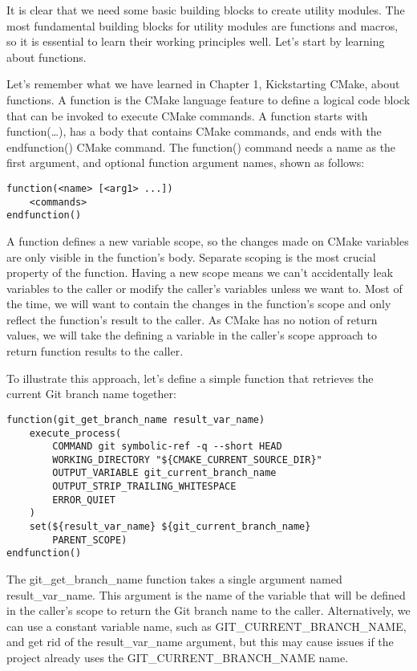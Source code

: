 
It is clear that we need some basic building blocks to create utility modules. The most fundamental building blocks for utility modules are functions and macros, so it is essential to learn their working principles well. Let's start by learning about functions.


Let's remember what we have learned in Chapter 1, Kickstarting CMake, about functions. A function is the CMake language feature to define a logical code block that can be invoked to execute CMake commands. A function starts with function(…), has a body that contains CMake commands, and ends with the endfunction() CMake command. The function() command needs a name as the first argument, and optional function argument names, shown as follows:

\begin{lstlisting}[style=styleCMake]
function(<name> [<arg1> ...])
	<commands>
endfunction()
\end{lstlisting}

A function defines a new variable scope, so the changes made on CMake variables are only visible in the function's body. Separate scoping is the most crucial property of the function. Having a new scope means we can't accidentally leak variables to the caller or modify the caller's variables unless we want to. Most of the time, we will want to contain the changes in the function's scope and only reflect the function's result to the caller. As CMake has no notion of return values, we will take the defining a variable in the caller's scope approach to return function results to the caller.

To illustrate this approach, let's define a simple function that retrieves the current Git branch name together:

\begin{lstlisting}[style=styleCMake]
function(git_get_branch_name result_var_name)
	execute_process(
		COMMAND git symbolic-ref -q --short HEAD
		WORKING_DIRECTORY "${CMAKE_CURRENT_SOURCE_DIR}"
		OUTPUT_VARIABLE git_current_branch_name
		OUTPUT_STRIP_TRAILING_WHITESPACE
		ERROR_QUIET
	)
	set(${result_var_name} ${git_current_branch_name}
		PARENT_SCOPE)
endfunction()
\end{lstlisting}

The git\_get\_branch\_name function takes a single argument named result\_var\_name. This argument is the name of the variable that will be defined in the caller's scope to return the Git branch name to the caller. Alternatively, we can use a constant variable name, such as GIT\_CURRENT\_BRANCH\_NAME, and get rid of the result\_var\_name argument, but this may cause issues if the project already uses the GIT\_CURRENT\_BRANCH\_NAME name.

